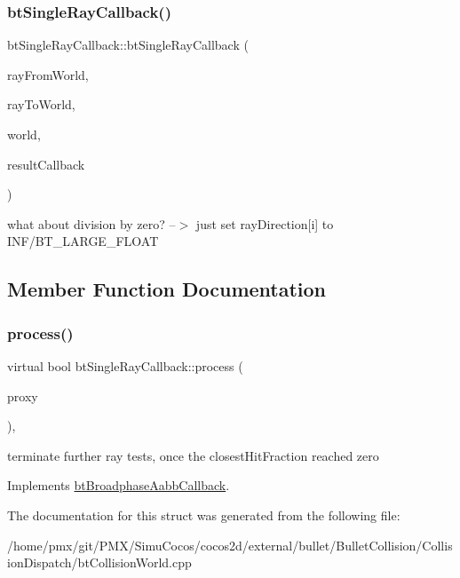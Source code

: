 \subsubsection{\texorpdfstring{bt\+Single\+Ray\+Callback()}{btSingleRayCallback()}}
{\footnotesize\ttfamily bt\+Single\+Ray\+Callback\+::bt\+Single\+Ray\+Callback (\begin{DoxyParamCaption}\item[{const bt\+Vector3 \&}]{ray\+From\+World,  }\item[{const bt\+Vector3 \&}]{ray\+To\+World,  }\item[{const \hyperlink{classbtCollisionWorld}{bt\+Collision\+World} $\ast$}]{world,  }\item[{\hyperlink{structbtCollisionWorld_1_1RayResultCallback}{bt\+Collision\+World\+::\+Ray\+Result\+Callback} \&}]{result\+Callback }\end{DoxyParamCaption})\hspace{0.3cm}{\ttfamily [inline]}}

what about division by zero? --$>$ just set ray\+Direction\mbox{[}i\mbox{]} to I\+N\+F/\+B\+T\+\_\+\+L\+A\+R\+G\+E\+\_\+\+F\+L\+O\+AT 

\subsection{Member Function Documentation}
\mbox{\label{structbtSingleRayCallback_a4e0dc3a4a2d92c6a838895c9add2a5c2}} 
\subsubsection{\texorpdfstring{process()}{process()}}
{\footnotesize\ttfamily virtual bool bt\+Single\+Ray\+Callback\+::process (\begin{DoxyParamCaption}\item[{const bt\+Broadphase\+Proxy $\ast$}]{proxy }\end{DoxyParamCaption})\hspace{0.3cm}{\ttfamily [inline]}, {\ttfamily [virtual]}}

terminate further ray tests, once the closest\+Hit\+Fraction reached zero 

Implements \hyperlink{structbtBroadphaseAabbCallback}{bt\+Broadphase\+Aabb\+Callback}.



The documentation for this struct was generated from the following file\+:\begin{DoxyCompactItemize}
\item 
/home/pmx/git/\+P\+M\+X/\+Simu\+Cocos/cocos2d/external/bullet/\+Bullet\+Collision/\+Collision\+Dispatch/bt\+Collision\+World.\+cpp\end{DoxyCompactItemize}
